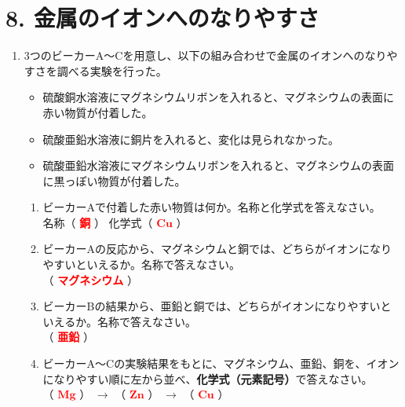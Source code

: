 \section*{8. 金属のイオンへのなりやすさ}
\begin{enumerate}
    \item 3つのビーカーA〜Cを用意し、以下の組み合わせで金属のイオンへのなりやすさを調べる実験を行った。
    \begin{itemize}
        \item[A:] 硫酸銅水溶液にマグネシウムリボンを入れると、マグネシウムの表面に赤い物質が付着した。
        \item[B:] 硫酸亜鉛水溶液に銅片を入れると、変化は見られなかった。
        \item[C:] 硫酸亜鉛水溶液にマグネシウムリボンを入れると、マグネシウムの表面に黒っぽい物質が付着した。
    \end{itemize}
    \begin{enumerate}
        \item ビーカーAで付着した赤い物質は何か。名称と化学式を答えなさい。\\[0.2cm]
        名称（ \textcolor{red}{\textbf{銅}} ） \hspace{1cm} 化学式（ \textcolor{red}{$\mathbf{Cu}$} ）
        \item ビーカーAの反応から、マグネシウムと銅では、どちらがイオンになりやすいといえるか。名称で答えなさい。\\[0.2cm]
        （ \textcolor{red}{\textbf{マグネシウム}} ）
        \item ビーカーBの結果から、亜鉛と銅では、どちらがイオンになりやすいといえるか。名称で答えなさい。\\[0.2cm]
        （ \textcolor{red}{\textbf{亜鉛}} ）
        \item ビーカーA〜Cの実験結果をもとに、マグネシウム、亜鉛、銅を、イオンになりやすい順に左から並べ、\textbf{化学式（元素記号）}で答えなさい。\\[0.2cm]
        （ \textcolor{red}{$\mathbf{Mg}$} ） $\rightarrow$ （ \textcolor{red}{$\mathbf{Zn}$} ） $\rightarrow$ （ \textcolor{red}{$\mathbf{Cu}$} ）
    \end{enumerate}
\end{enumerate}
